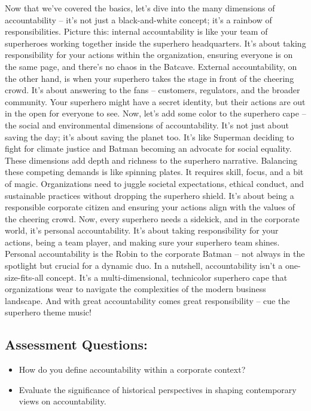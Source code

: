 \documentclass[
  letterpaper,
  DIV=11,
  numbers=noendperiod]{scrreprt}
\begin{document}
Now that we've covered the basics, let's dive into the many dimensions
of accountability -- it's not just a black-and-white concept; it's a
rainbow of responsibilities. Picture this: internal accountability is
like your team of superheroes working together inside the superhero
headquarters. It's about taking responsibility for your actions within
the organization, ensuring everyone is on the same page, and there's no
chaos in the Batcave. External accountability, on the other hand, is
when your superhero takes the stage in front of the cheering crowd. It's
about answering to the fans -- customers, regulators, and the broader
community. Your superhero might have a secret identity, but their
actions are out in the open for everyone to see. Now, let's add some
color to the superhero cape -- the social and environmental dimensions
of accountability. It's not just about saving the day; it's about saving
the planet too. It's like Superman deciding to fight for climate justice
and Batman becoming an advocate for social equality. These dimensions
add depth and richness to the superhero narrative. Balancing these
competing demands is like spinning plates. It requires skill, focus, and
a bit of magic. Organizations need to juggle societal expectations,
ethical conduct, and sustainable practices without dropping the
superhero shield. It's about being a responsible corporate citizen and
ensuring your actions align with the values of the cheering crowd. Now,
every superhero needs a sidekick, and in the corporate world, it's
personal accountability. It's about taking responsibility for your
actions, being a team player, and making sure your superhero team
shines. Personal accountability is the Robin to the corporate Batman --
not always in the spotlight but crucial for a dynamic duo. In a
nutshell, accountability isn't a one-size-fits-all concept. It's a
multi-dimensional, technicolor superhero cape that organizations wear to
navigate the complexities of the modern business landscape. And with
great accountability comes great responsibility -- cue the superhero
theme music!

\subsection{Assessment Questions:}\label{assessment-questions-3}

\begin{itemize}
\item
  How do you define accountability within a corporate context?
\item
  Evaluate the significance of historical perspectives in shaping
  contemporary views on accountability.
\end{itemize}
\end{document}
